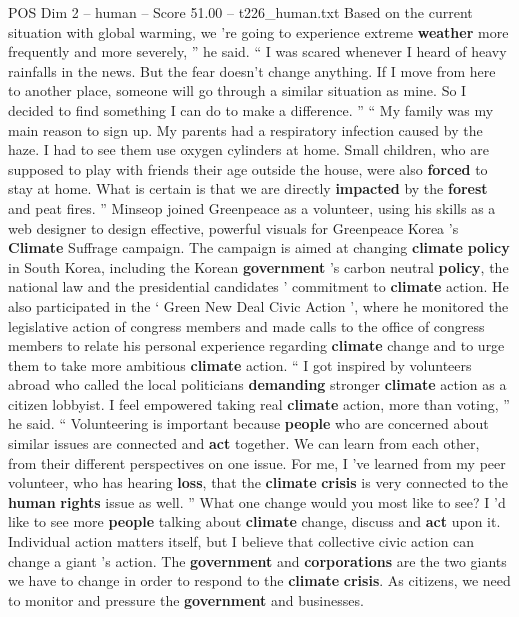 \begin{textsample}{POS Dim 2 – human – Score 51.00 – t226\_human.txt}
Based on the current situation with global warming, we ’re going to experience extreme \textbf{weather} more frequently and more severely, ” he said. “ I was scared whenever I heard of heavy rainfalls in the news.
But the fear doesn't change anything.
If I move from here to another place, someone will go through a similar situation as mine.
So I decided to find something I can do to make a difference. ” “ My family was my main reason to sign up.
My parents had a respiratory infection caused by the haze.
I had to see them use oxygen cylinders at home.
Small children, who are supposed to play with friends their age outside the house, were also \textbf{forced} to stay at home.
What is certain is that we are directly \textbf{impacted} by the \textbf{forest} and peat fires. ” Minseop joined Greenpeace as a volunteer, using his skills as a web designer to design effective, powerful visuals for Greenpeace Korea ’s \textbf{Climate} Suffrage campaign.
The campaign is aimed at changing \textbf{climate} \textbf{policy} in South Korea, including the Korean \textbf{government} ’s carbon neutral \textbf{policy}, the national law and the presidential candidates ’ commitment to \textbf{climate} action.
He also participated in the ‘ Green New Deal Civic Action ’, where he monitored the legislative action of congress members and made calls to the office of congress members to relate his personal experience regarding \textbf{climate} change and to urge them to take more ambitious \textbf{climate} action. “ I got inspired by volunteers abroad who called the local politicians \textbf{demanding} stronger \textbf{climate} action as a citizen lobbyist.
I feel empowered taking real \textbf{climate} action, more than voting, ” he said. “ Volunteering is important because \textbf{people} who are concerned about similar issues are connected and \textbf{act} together.
We can learn from each other, from their different perspectives on one issue.
For me, I ’ve learned from my peer volunteer, who has hearing \textbf{loss}, that the \textbf{climate} \textbf{crisis} is very connected to the \textbf{human} \textbf{rights} issue as well. ” What one change would you most like to see?
I ’d like to see more \textbf{people} talking about \textbf{climate} change, discuss and \textbf{act} upon it.
Individual action matters itself, but I believe that collective civic action can change a giant ’s action.
The \textbf{government} and \textbf{corporations} are the two giants we have to change in order to respond to the \textbf{climate} \textbf{crisis}.
As citizens, we need to monitor and pressure the \textbf{government} and businesses.

\end{textsample}
